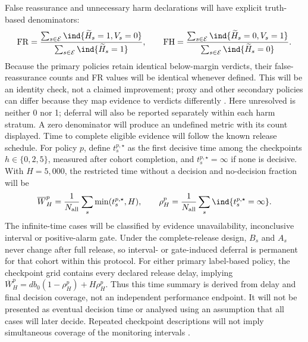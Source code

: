 False reassurance and unnecessary harm declarations will have explicit truth-based denominators:
\begin{equation}
\mathrm{FR}=\frac{\sum_{s\in\mathcal E}\ind\{\widetilde H_s=1,V_s=0\}}{\sum_{s\in\mathcal E}\ind\{\widetilde H_s=1\}},\qquad
\mathrm{FH}=\frac{\sum_{s\in\mathcal E}\ind\{\widetilde H_s=0,V_s=1\}}{\sum_{s\in\mathcal E}\ind\{\widetilde H_s=0\}}.
\end{equation}
Because the primary policies retain identical below-margin verdicts, their false-reassurance counts and FR values will be identical whenever defined. This will be an identity check, not a claimed improvement; proxy and other secondary policies can differ because they map evidence to verdicts differently \cite{selective}.
Here unresolved is neither 0 nor 1; deferral will also be reported separately within each harm stratum. A zero denominator will produce an undefined metric with its count displayed. Time to complete eligible evidence will follow the known release schedule. For policy $p$, define $t_s^{p,\star}$ as the first decisive time among the checkpoints $h\in\{0,2,5\}$, measured after cohort completion, and $t_s^{p,\star}=\infty$ if none is decisive. With $H=5{,}000$, the restricted time without a decision and no-decision fraction will be
\begin{equation}
\overline W_H^p=\frac{1}{N_{\mathrm{all}}}\sum_s\min(t_s^{p,\star},H),\qquad
\rho_H^p=\frac{1}{N_{\mathrm{all}}}\sum_s\ind\{t_s^{p,\star}=\infty\}.
\end{equation}
The infinite-time cases will be classified by evidence unavailability, inconclusive interval or positive-alarm gate. Under the complete-release design, $B_s$ and $A_s$ never change after full release, so interval- or gate-induced deferral is permanent for that cohort within this protocol. For either primary label-based policy, the checkpoint grid contains every declared release delay, implying $\overline W_H^p=db_0(1-\rho_H^p)+H\rho_H^p$. Thus this time summary is derived from delay and final decision coverage, not an independent performance endpoint. It will not be presented as eventual decision time or analysed using an assumption that all cases will later decide. Repeated checkpoint descriptions will not imply simultaneous coverage of the monitoring intervals \cite{alencar,selective}.

